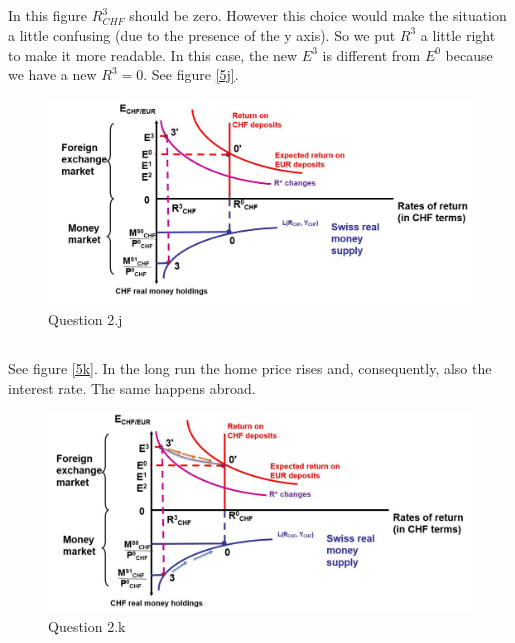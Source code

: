 \documentclass[	11pt, ]{fphw}
\begin{document}
\subsection{}
In this figure $R^{3}_{CHF}$ should be zero. However this choice would make the situation a little confusing (due to the presence of the y axis). So we put $R^{3}$ a little right to make it more readable. In this case, the new $E^{3}$ is different from $E^{0}$ because we have a new $R^{3}=0$. See figure \vref{5j}.
\begin{figure}[h] 
\centering 
\includegraphics[scale=0.65]{5j.JPG} 
\caption{Question 2.j} 
\label{5j}
\end{figure}

\subsection{}
See figure \vref{5k}. In the long run the home price rises and, consequently, also the interest rate. The same happens abroad.
\begin{figure}[h] 
\centering 
\includegraphics[scale=0.65]{5k.JPG} 
\caption{Question 2.k} 
\label{5k}
\end{figure}
\end{document}

